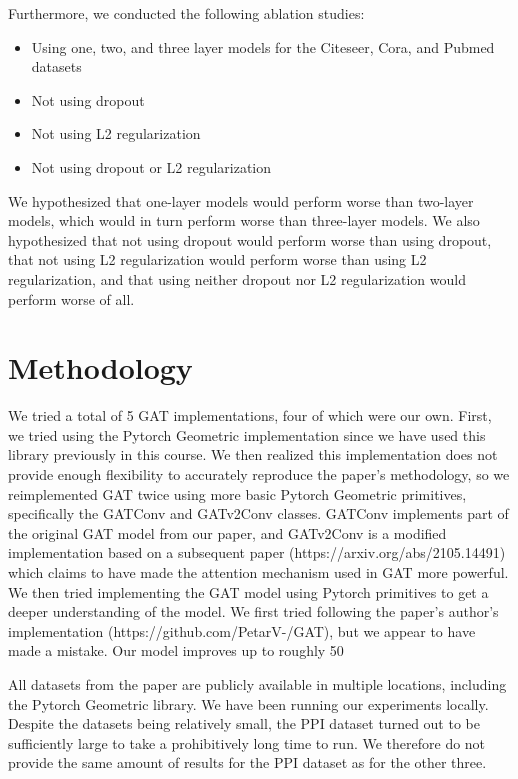 \documentclass{article}
\begin{document}
    Furthermore, we conducted the following ablation studies:
    \begin{itemize}
        \item Using one, two, and three layer models for the Citeseer, Cora, and Pubmed datasets
	\item Not using dropout
	\item Not using L2 regularization
	\item Not using dropout or L2 regularization
    \end{itemize}
    We hypothesized that one-layer models would perform worse than two-layer models, which would in turn perform worse than three-layer models. We also hypothesized that not using dropout would perform worse than using dropout, that not using L2 regularization would perform worse than using L2 regularization, and that using neither dropout nor L2 regularization would perform worse of all.

    \section{Methodology}\label{sec:methodology}
    We tried a total of 5 GAT implementations, four of which were our own. First, we tried using the Pytorch Geometric implementation since we have used this library previously in this course. We then realized this implementation does not provide enough flexibility to accurately reproduce the paper's methodology, so we reimplemented GAT twice using more basic Pytorch Geometric primitives, specifically the GATConv and GATv2Conv classes. GATConv implements part of the original GAT model from our paper, and GATv2Conv is a modified implementation based on a subsequent paper (https://arxiv.org/abs/2105.14491) which claims to have made the attention mechanism used in GAT more powerful. We then tried implementing the GAT model using Pytorch primitives to get a deeper understanding of the model. We first tried following the paper's author's implementation (https://github.com/PetarV-/GAT), but we appear to have made a mistake. Our model improves up to roughly 50%

    All datasets from the paper are publicly available in multiple locations, including the Pytorch Geometric library. We have been running our experiments locally. Despite the datasets being relatively small, the PPI dataset turned out to be sufficiently large to take a prohibitively long time to run. We therefore do not provide the same amount of results for the PPI dataset as for the other three.
\end{document}
